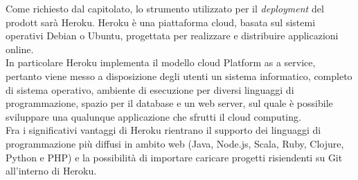 		Come richiesto dal capitolato, lo strumento utilizzato per il \textit{deployment} del prodott sarà Heroku.
		Heroku è una piattaforma cloud, basata sul sistemi operativi Debian o Ubuntu, progettata per realizzare e distribuire applicazioni online. \\
		In particolare Heroku implementa il modello cloud Platform as a service, pertanto viene messo a disposizione degli utenti un sistema informatico, completo di sistema operativo, ambiente di esecuzione per diversi linguaggi di programmazione, spazio per il database e un web server, sul quale è possibile sviluppare una qualunque applicazione che sfrutti il cloud computing.\\
		Fra i significativi vantaggi di Heroku rientrano il supporto dei linguaggi di programmazione più diffusi in ambito web (Java, Node.js, Scala, Ruby, Clojure, Python e PHP) e la possibilità di importare caricare progetti risiendenti su Git all'interno di Heroku.
	
